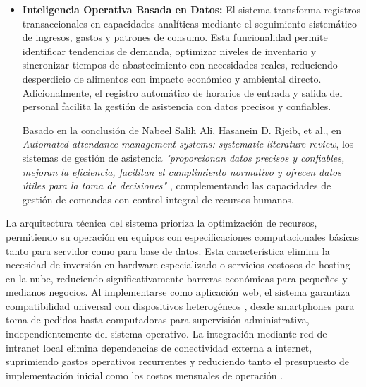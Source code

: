 \begin{itemize}
	Esta convergencia entre hardware especializado y desarrollo de software representa el núcleo de la formación en Ingeniería Electrónica, donde la comprensión de principios electromagnéticos, comunicaciones digitales y sistemas de control se aplican para resolver problemas reales de automatización y seguridad. El diseño del dispositivo NFC como mecanismo de autenticación física complementa controles lógicos implementados en software, demostrando la transversalidad característica de proyectos electrónicos modernos que trascienden el desarrollo puramente informático al integrar sensores, actuadores y sistemas de comunicación de bajo nivel con capas de aplicación de alto nivel \cite{Liyanage2018}.
	
	\item \textbf{Inteligencia Operativa Basada en Datos:} 
	El sistema transforma registros transaccionales en capacidades analíticas mediante el seguimiento sistemático de ingresos, gastos y patrones de consumo. Esta funcionalidad permite identificar tendencias de demanda, optimizar niveles de inventario y sincronizar tiempos de abastecimiento con necesidades reales, reduciendo desperdicio de alimentos con impacto económico y ambiental directo. Adicionalmente, el registro automático de horarios de entrada y salida del personal facilita la gestión de asistencia con datos precisos y confiables.
	
	Basado en la conclusión de Nabeel Salih Ali, Hasanein D. Rjeib, et al., en \textit{Automated attendance management systems: systematic literature review}, los sistemas de gestión de asistencia \textit{"proporcionan datos precisos y confiables, mejoran la eficiencia, facilitan el cumplimiento normativo y ofrecen datos útiles para la toma de decisiones"} \cite{Automatedattendance}, complementando las capacidades de gestión de comandas con control integral de recursos humanos.
\end{itemize}

La arquitectura técnica del sistema prioriza la optimización de recursos, permitiendo su operación en equipos con especificaciones computacionales básicas tanto para servidor como para base de datos. Esta característica elimina la necesidad de inversión en hardware especializado o servicios costosos de hosting en la nube, reduciendo significativamente barreras económicas para pequeños y medianos negocios. Al implementarse como aplicación web, el sistema garantiza compatibilidad universal con dispositivos heterogéneos \cite{BALSAM2025112186}, desde smartphones para toma de pedidos hasta computadoras para supervisión administrativa, independientemente del sistema operativo. La integración mediante red de intranet local elimina dependencias de conectividad externa a internet, suprimiendo gastos operativos recurrentes y reduciendo tanto el presupuesto de implementación inicial como los costos mensuales de operación \cite{akyildiz2006survey}.


